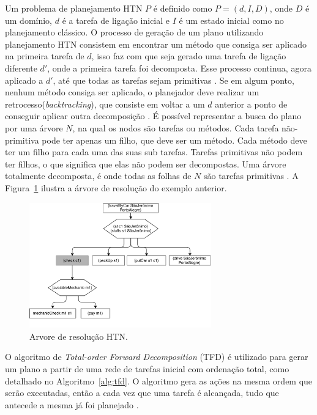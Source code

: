 Um problema de planejamento HTN $P$ é definido como $P = (d, I, D)$, onde $D$ é um domínio, $d$ é a tarefa de ligação inicial e $I$ é um estado inicial como no planejamento clássico. 
O processo de geração de um plano utilizando planejamento HTN consistem em encontrar um método que consiga ser aplicado na primeira tarefa de $d$, isso faz com que seja gerado uma tarefa de ligação diferente $d'$, onde a primeira tarefa foi decomposta. 
Esse processo continua, agora aplicado a $d'$, até que todas as tarefas sejam primitivas \cite{meneguzzi2015planning}. 
Se em algum ponto, nenhum método consiga ser aplicado, o planejador deve realizar um retrocesso(\textit{backtracking}), que consiste em voltar a um $d$ anterior a ponto de conseguir aplicar outra decomposição \cite[Capítulo 11]{intelligence2003modern}. 
É possível representar a busca do plano por uma árvore $N$, na qual os nodos são tarefas ou métodos. 
Cada tarefa não-primitiva pode ter apenas um filho, que deve ser um método. 
Cada método deve ter um filho para cada uma das suas sub tarefas. 
Tarefas primitivas não podem ter filhos, o que significa que elas não podem ser decompostas. 
Uma árvore totalmente decomposta, é onde todas as folhas de $N$ são tarefas primitivas \cite{ontanon2015adversarial}. 
A Figura~\ref{fig:htnmethodtree} ilustra a árvore de resolução do exemplo anterior.

\begin{figure}[ht]
	\centering
	\includegraphics[width=0.7\textwidth]{fig/htnmethodresult.pdf}
	\caption{Arvore de resolução HTN.}
	\label{fig:htnmethodtree}
\end{figure}

O algoritmo de \textit{Total-order Forward Decomposition} (TFD) é utilizado para gerar um plano a partir de uma rede de tarefas inicial com ordenação total, como detalhado no Algoritmo~\ref{alg:tfd}.
O algoritmo gera as ações na mesma ordem que serão executadas, então a cada vez que uma tarefa é alcançada, tudo que antecede a mesma já foi planejado \cite{ghallab2004automated}.
 
